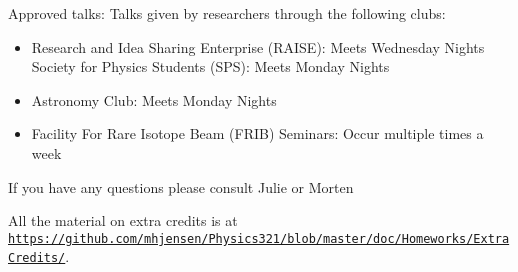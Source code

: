 \documentclass[%
oneside,                 %
final,                   %
10pt]{article}
\begin{document}
\noindent
Approved talks:
Talks given by researchers through the following clubs:
\begin{itemize}
\item Research and Idea Sharing Enterprise (RAISE)​: Meets Wednesday Nights Society for Physics Students (SPS)​: Meets Monday Nights

\item Astronomy Club​: Meets Monday Nights

\item Facility For Rare Isotope Beam (FRIB) Seminars: ​Occur multiple times a week
\end{itemize}

\noindent
If you have any questions please consult Julie or Morten

All the material on extra credits is at \href{{https://github.com/mhjensen/Physics321/blob/master/doc/Homeworks/ExtraCredits/}}{\nolinkurl{https://github.com/mhjensen/Physics321/blob/master/doc/Homeworks/ExtraCredits/}}. 


\end{document}
